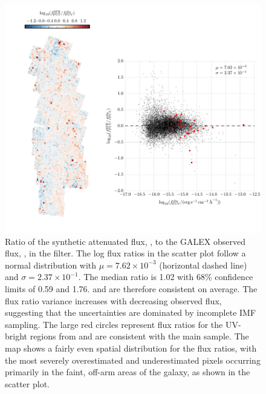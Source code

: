 \documentclass[iop, tighten]{emulateapj}
\begin{document}
\begin{figure}
\centering
\includegraphics[width=\textwidth]{m31flux-figures/flux_fuv_sfh-vs-obs.pdf}
\caption[Ratio of the synthetic flux to the observed flux in the \fuv{}
filter.]{Ratio of the synthetic attenuated flux, \ffuvsfh{}, to the GALEX
    observed flux, \ffuvobs{}, in the \fuv{} filter. The log flux ratios in the
    scatter plot follow a normal distribution with $\mu = 7.62\times 10^{-3}$
    (horizontal dashed line) and $\sigma = 2.37\times 10^{-1}$. The median
    ratio is 1.02 with 68\% confidence limits of 0.59 and 1.76. \ffuvsfh{} and
    \ffuvobs{} are therefore consistent on average. The flux ratio variance
    increases with decreasing observed flux, suggesting that the uncertainties
    are dominated by incomplete IMF sampling. The large red circles represent
    flux ratios for the UV-bright regions from \citet{Simones:2014} and are
    consistent with the main sample. The map shows a fairly even spatial
    distribution for the flux ratios, with the most severely overestimated and
    underestimated pixels occurring primarily in the faint, off-arm areas of
    the galaxy, as shown in the scatter plot.
}
\label{fig:fuvfluxratio}
\end{figure}
\end{document}
